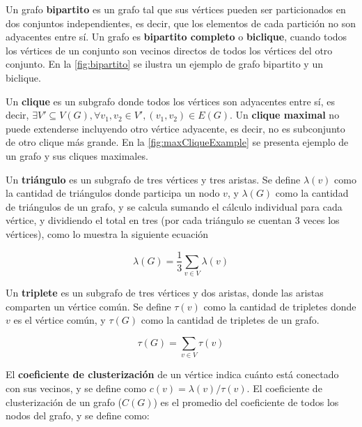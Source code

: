 Un grafo \textbf{bipartito} es un grafo tal que sus vértices pueden ser particionados en dos conjuntos independientes, es decir, que los elementos de cada partición no son adyacentes entre sí. Un grafo es \textbf{bipartito completo} o \textbf{biclique}, cuando todos los vértices de un conjunto son vecinos directos de todos los vértices del otro conjunto. En la \autoref{fig:bipartito} se ilustra un ejemplo de grafo bipartito y un biclique.

Un \textbf{clique} es un subgrafo donde todos los vértices son adyacentes entre sí, es decir, $\exists V' \subseteq V(G), \forall v_{1}, v_{2} \in V', (v_{1}, v_{2}) \in E(G) $. Un \textbf{clique maximal} no puede extenderse incluyendo otro vértice adyacente, es decir, no es subconjunto de otro clique más grande. En la \autoref{fig:maxCliqueExample} se presenta ejemplo de un grafo y sus cliques maximales.



Un \textbf{triángulo} es un subgrafo de tres vértices y tres aristas. Se define $\lambda(v)$ como la cantidad de triángulos donde participa un nodo $v$, y $\lambda(G)$ como la cantidad de triángulos de un grafo, y se calcula sumando el cálculo individual para cada vértice, y dividiendo el total en tres (por cada triángulo se cuentan 3 veces los vértices), como lo muestra la siguiente ecuación

\begin{equation}
	\lambda(G) = \dfrac{1}{3} \sum_{v \in V} \lambda(v) \label{eq:triangles}
\end{equation}

Un \textbf{triplete} es un subgrafo de tres vértices y dos aristas, donde las aristas comparten un vértice común. Se define $\tau(v)$ como la cantidad de tripletes donde $v$ es el vértice común, y $\tau(G)$ como la cantidad de tripletes de un grafo.

\begin{equation}
	\tau(G) = \sum_{v \in V} \tau(v) \label{eq:triplets}
\end{equation}

El \textbf{coeficiente de clusterización} de un vértice indica cuánto está conectado con sus vecinos, y se define como $c(v) =  \lambda(v) / \tau(v)$. El coeficiente de clusterización de un grafo ($C(G)$) es el promedio del coeficiente de todos los nodos del grafo, y se define como:

